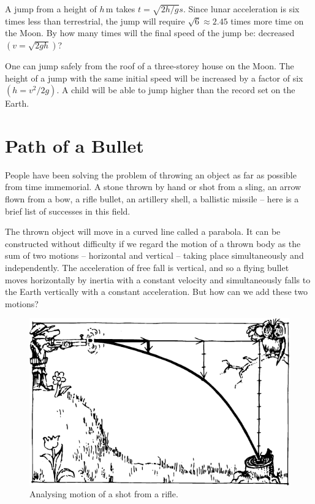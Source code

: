 A jump from a height of $h \,\si{\meter}$ takes $t = \sqrt{2h/g} s$. Since lunar acceleration is six times less than terrestrial, the jump will require $\sqrt{6} \approx 2.45$ times more time on the Moon. By how many times will the final speed of the jump be: decreased $(v = \sqrt{2gh})$?

One can jump safely from the roof of a three-storey
house on the Moon. The height of a jump with the same
initial speed will be increased by a factor of six $(h = v^{2}/2g)$.
A child will be able to jump higher than the record set
on the Earth.

\section{Path of a Bullet}

People have been solving the problem of throwing an
object as far as possible from time immemorial. A stone
thrown by hand or shot from a sling, an arrow flown from a bow, a rifle bullet, an artillery shell, a ballistic missile -- here is a brief list of successes in this field.

The thrown object will move in a curved line called
a parabola. It can be constructed without difficulty if
we regard the motion of a thrown body as the sum of two
motions -- horizontal and vertical -- taking place simultaneously and independently. The acceleration of free fall
is vertical, and so a flying bullet moves horizontally by
inertia with a constant velocity and simultaneously falls
to the Earth vertically with a constant acceleration. But
how can we add these two motions?
\begin{figure}[!ht]
\centering
\includegraphics[width=\textwidth]{figures/fig-02-03.pdf}
\caption{Analysing motion of a shot from a rifle.}
\label{fig-2.03}
\end{figure}

